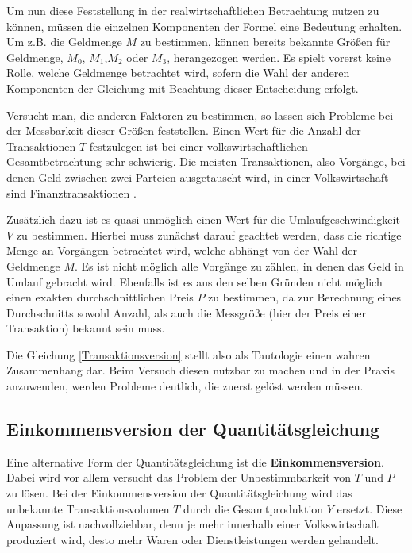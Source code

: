 Um nun diese Feststellung in der realwirtschaftlichen Betrachtung nutzen zu können, müssen die einzelnen Komponenten der Formel eine Bedeutung erhalten. Um z.B. die Geldmenge $M$ zu bestimmen, können bereits bekannte Größen für Geldmenge, $M_0$, $M_1$,$M_2$ oder $M_3$, herangezogen werden. Es spielt vorerst keine Rolle, welche Geldmenge betrachtet wird, sofern die Wahl der anderen Komponenten der Gleichung mit Beachtung dieser Entscheidung erfolgt.

Versucht man, die anderen Faktoren zu bestimmen, so lassen sich Probleme bei der Messbarkeit dieser Größen feststellen. Einen Wert für die Anzahl der Transaktionen $T$ festzulegen ist bei einer volkswirtschaftlichen Gesamtbetrachtung sehr schwierig. Die meisten Transaktionen, also Vorgänge, bei denen Geld zwischen zwei Parteien ausgetauscht wird, in einer Volkswirtschaft sind Finanztransaktionen \autocite[123]{mankiw2017}.

Zusätzlich dazu ist es quasi unmöglich einen Wert für die Umlaufgeschwindigkeit $V$ zu bestimmen. Hierbei muss zunächst darauf geachtet werden, dass die richtige Menge an Vorgängen betrachtet wird, welche abhängt von der Wahl der Geldmenge $M$. Es ist nicht möglich alle Vorgänge zu zählen, in denen das Geld in Umlauf gebracht wird.
Ebenfalls ist es aus den selben Gründen nicht möglich einen exakten durchschnittlichen Preis $P$ zu bestimmen, da zur Berechnung eines Durchschnitts sowohl Anzahl, als auch die Messgröße (hier der Preis einer Transaktion) bekannt sein muss.

Die Gleichung \vref{Transaktionsversion} stellt also als Tautologie einen wahren Zusammenhang dar. Beim Versuch diesen nutzbar zu machen und in der Praxis anzuwenden, werden Probleme deutlich, die zuerst gelöst werden müssen.

\subsection{Einkommensversion der Quantitätsgleichung}

Eine alternative Form der Quantitätsgleichung ist die \textbf{Einkommensversion}. Dabei wird vor allem versucht das Problem der Unbestimmbarkeit von $T$ und $P$ zu lösen. Bei der Einkommensversion der Quantitätsgleichung wird das unbekannte Transaktionsvolumen $T$ durch die Gesamtproduktion $Y$ ersetzt. Diese Anpassung ist nachvollziehbar, denn je mehr innerhalb einer Volkswirtschaft produziert wird, desto mehr Waren oder Dienstleistungen werden gehandelt\autocite[125]{mankiw2017}.

